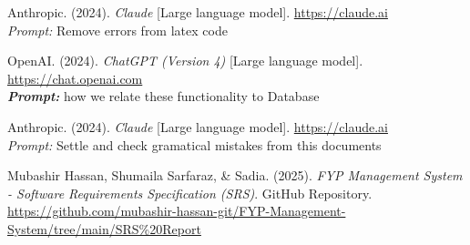 \documentclass[12pt,a4paper]{report}
\begin{document}
Anthropic. (2024). \textit{Claude } [Large language model]. 
\url{https://claude.ai} \\
\textit{Prompt: } Remove errors from latex code 

OpenAI. (2024). \textit{ChatGPT (Version 4)} [Large language model]. 
\url{https://chat.openai.com} \\
\textit \textbf{Prompt: } how we relate these functionality to Database 

Anthropic. (2024). \textit{Claude } [Large language model]. 
\url{https://claude.ai} \\
\textit{Prompt: } Settle and check gramatical mistakes from this documents

Mubashir Hassan, Shumaila Sarfaraz, \& Sadia. (2025). \textit{FYP Management System - 
Software Requirements Specification (SRS)}. GitHub Repository. 
\url{https://github.com/mubashir-hassan-git/FYP-Management-System/tree/main/SRS\%20Report}
\end{document}
